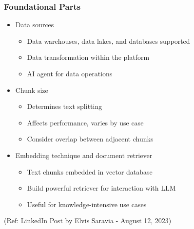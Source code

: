 \begin{frame}[fragile]\frametitle{Foundational Parts}


\begin{itemize}
    \item Data sources
    \begin{itemize}
        \item Data warehouses, data lakes, and databases supported
        \item Data transformation within the platform
        \item AI agent for data operations
    \end{itemize}
    \item Chunk size
    \begin{itemize}
        \item Determines text splitting
        \item Affects performance, varies by use case
        \item Consider overlap between adjacent chunks
    \end{itemize}
    \item Embedding technique and document retriever
    \begin{itemize}
        \item Text chunks embedded in vector database
        \item Build powerful retriever for interaction with LLM
        \item Useful for knowledge-intensive use cases
    \end{itemize}
\end{itemize}

{\tiny (Ref: LinkedIn Post by Elvis Saravia -  August 12, 2023)}

\end{frame}





